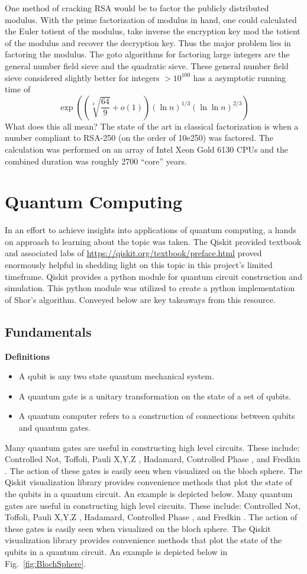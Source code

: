 \documentclass[journal]{IEEEtran}
\begin{document}
One method of cracking RSA would be to factor the publicly distributed modulus.
With the prime factorization of modulus in hand, one could calculated the Euler
totient of the modulus, take inverse  the encryption key mod the totient of the
modulus and recover the decryption key. Thus the major problem lies in
factoring the modulus. The goto algorithms for factoring large integers are the
general number field sieve and the quadratic sieve. These general number field
sieve considered slightly better for integers \(> 10^{100}\)  has a asymptotic running
time of
\[\exp\left(\left(\sqrt[3]{\frac{64}{9}} +o( 1)\right)(\ln n)^{1/3}(\ln\ln n)^{2/3}\right) \]
What does this all mean? The state of the art \cite{Zimmermann2020} in classical factorization is when
a number compliant to RSA-250 (on the order of 10e250) was factored. The
calculation was performed on an array of Intel Xeon Gold 6130 CPUs and the
combined duration was roughly 2700 ``core'' years.

\section{Quantum Computing}
In an effort to achieve insights into applications of quantum computing, a hands
on approach to learning about the topic was taken. The Qiskit provided textbook and associated
labs of \url{https://qiskit.org/textbook/preface.html}
proved enormously helpful in shedding light on this topic in this project's
limited timeframe. Qiskit provides a python module for quantum circuit
construction and simulation. This python module was utilized to create a python
implementation of Shor's algorithm. Conveyed below are key takeaways from this
resource.
\subsection{Fundamentals}
\textbf{Definitions}
\begin{itemize}
    \item A qubit is any two state quantum mechanical system.
    \item A quantum gate is a unitary transformation on the state of a set of qubits.
    \item A quantum computer refers to a construction of connections between qubits and quantum gates.
\end{itemize}
Many quantum gates are useful in constructing high level circuits. These
include: Controlled Not, Toffoli, Pauli X,Y,Z , Hadamard, Controlled Phase , and
Fredkin . The action of these gates is easily seen when visualized on the bloch
sphere. The Qiskit visualization library provides convenience methods that plot
the state of the qubits in a quantum circuit. An example is depicted below.
Many quantum gates are useful in constructing high level circuits. These
include: Controlled Not, Toffoli, Pauli X,Y,Z , Hadamard, Controlled Phase , and
Fredkin . The action of these gates is easily seen when visualized on the bloch
sphere. The Qiskit visualization library provides convenience methods that plot
the state of the qubits in a quantum circuit. An example is depicted below in Fig.~\ref{fig:BlochSphere}.
\end{document}
